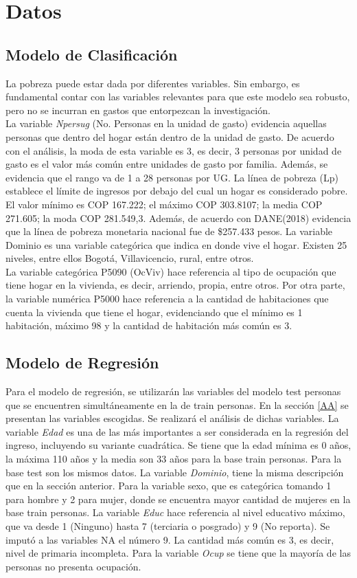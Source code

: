 \documentclass[conference, 10pt]{IEEEtran}
\begin{document}
\section{Datos}
\subsection{Modelo de Clasificación}
La pobreza puede estar dada por diferentes variables. Sin embargo, es fundamental contar con las variables relevantes para que este modelo sea robusto, pero no se incurran en gastos que entorpezcan la investigación.\\
La variable \textit{Npersug} (No. Personas en la unidad de gasto) evidencia aquellas personas que dentro del hogar están dentro de la unidad de gasto. De acuerdo con el análisis, la moda de esta variable es 3, es decir, 3 personas por unidad de gasto es el valor más común entre unidades de gasto por familia. Además, se evidencia que el rango va de 1 a 28 personas por UG.
La línea de pobreza (Lp) establece el límite de ingresos por debajo del cual un hogar es considerado pobre. El valor mínimo es COP 167.222;  el máximo COP 303.8107; la media COP 271.605; la moda COP 281.549,3. Además, de acuerdo con DANE(2018) evidencia que la línea de pobreza monetaria nacional fue de \$257.433 pesos.
La variable Dominio es una variable categórica que indica en donde vive el hogar. Existen 25 niveles, entre ellos Bogotá, Villavicencio, rural, entre otros. \\
La variable categórica P5090 (OcViv) hace referencia al tipo de ocupación que tiene hogar en la vivienda, es decir, arriendo, propia, entre otros. Por otra parte, la variable numérica P5000 hace referencia a la cantidad de habitaciones que cuenta la vivienda que tiene el hogar, evidenciando que el mínimo es 1 habitación, máximo 98 y la cantidad de habitación más común es 3.

\subsection{Modelo de Regresión}
Para el modelo de regresión, se utilizarán las variables del modelo test personas que se encuentren simultáneamente en la de train personas. En la sección \ref{AA} se presentan las variables escogidas. Se realizará el análisis de dichas variables. La variable \textit{Edad} es una de las más importantes a ser considerada en la regresión del ingreso, incluyendo su variante cuadrática. Se tiene que la edad mínima es 0 años, la máxima 110 años y la media son 33 años para la base train personas. Para la base test son los mismos datos. La variable \textit{Dominio}, tiene la misma descripción que en la sección anterior. Para la variable sexo, que es categórica tomando 1 para hombre y 2 para mujer, donde se encuentra mayor cantidad de mujeres en  la base train personas. La variable \textit{Educ} hace referencia al nivel educativo máximo, que va desde 1 (Ninguno) hasta 7 (terciaria o posgrado) y 9 (No reporta). Se imputó a las variables NA el número 9. La cantidad más común es 3, es decir, nivel de primaria incompleta. Para la variable \textit{Ocup} se tiene que la mayoría de las personas no presenta ocupación.
\end{document}
